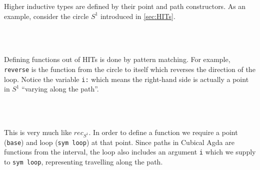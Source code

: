 Higher inductive types are defined by their point and path constructors. As an
example, consider the circle $S^1$ introduced in \autoref{sec:HITs}.
\begin{code}%
\>[0]\AgdaSpace{}%
\AgdaSpace{}%
\AgdaSymbol{:}\AgdaSpace{}%
\AgdaSpace{}%
\<%
\\
\>[0][@{}l@{\AgdaIndent{0}}]%
\>[2]\AgdaSpace{}%
\AgdaSymbol{:}\AgdaSpace{}%
\<%
\\
%
\>[2]\AgdaSpace{}%
\AgdaSymbol{:}\AgdaSpace{}%
\AgdaSpace{}%
\AgdaSpace{}%
\<%
\end{code}
Defining functions out of HITs is done by pattern matching.
For example, \texttt{reverse} is the function from the circle to itself which
reverses the direction of the loop.
Notice the variable \texttt{i:\I} which means the right-hand side is actually a point in $S^1$
``varying along the path''.
\begin{code}%
\>[0]\AgdaSpace{}%
\AgdaSymbol{:}\AgdaSpace{}%
\AgdaSpace{}%
\AgdaSpace{}%
\<%
\\
\>[0]\AgdaSpace{}%
\AgdaSpace{}%
\AgdaSymbol{=}\AgdaSpace{}%
\<%
\\
\>[0]\AgdaSpace{}%
\AgdaSymbol{(}\AgdaSpace{}%
\AgdaSymbol{)}\AgdaSpace{}%
\AgdaSymbol{=}\AgdaSpace{}%
\AgdaSpace{}%
\AgdaSpace{}%
\<%
\end{code}
This is very much like $rec_{S^1}$. In order to define a function we require a point (\texttt{base})
and loop (\texttt{sym loop}) at that point. Since paths in Cubical Agda are functions from the interval,
the loop also includes an argument \texttt{i} which we supply to \texttt{sym loop}, representing
travelling along the path.

